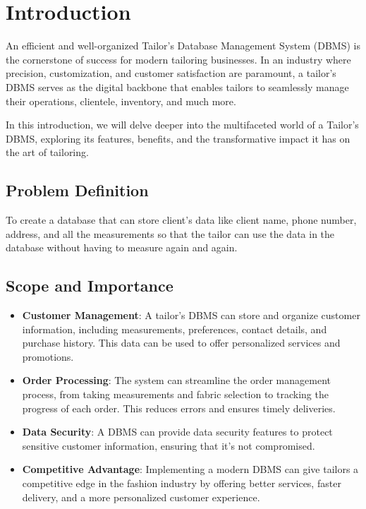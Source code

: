 \documentclass[12pt, letter paper]{report}
\begin{document}
{\chapter{Introduction}
\begin{spacing}{1.5}
An efficient and well-organized Tailor's Database Management System (DBMS) is the cornerstone of success for modern tailoring businesses. In an industry where precision, customization, and customer satisfaction are paramount, a tailor's DBMS serves as the digital backbone that enables tailors to seamlessly manage their operations, clientele, inventory, and much more.

 In this introduction, we will delve deeper into the multifaceted world of a Tailor's DBMS, exploring its features, benefits, and the transformative impact it has on the art of tailoring.
\end{spacing}
\section{Problem Definition} 
\begin{spacing}{1.5}
To create a database that can store client’s data like client name, phone number, address, and all the measurements so that the tailor can use the data in the database without having to measure again and again.
\end{spacing}
\section{Scope and Importance}
\begin{spacing}{1.5}
\begin{itemize}
\item \textbf{Customer Management}: A tailor's DBMS can store and organize customer information, including measurements, preferences, contact details, and purchase history. This data can be used to offer personalized services and promotions.
\item \textbf{Order Processing}: The system can streamline the order management process, from taking measurements and fabric selection to tracking the progress of each order. This reduces errors and ensures timely deliveries.
\item \textbf{Data Security}: A DBMS can provide data security features to protect sensitive customer information, ensuring that it's not compromised.
\item \textbf{Competitive Advantage}: Implementing a modern DBMS can give tailors a competitive edge in the fashion industry by offering better services, faster delivery, and a more personalized customer experience.
\end{itemize}
\end{spacing}
}
\end{document}
